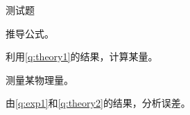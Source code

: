 \documentclass[answer]{cphos-e}
\begin{document}
\maketitlepage

\begin{problem}[30]{测试题}

\begin{expcontent}

\subq\label{q:theory1} 推导公式。

\subq\label{q:theory2} 利用\ref{q:theory1}的结果，计算某量。

\label{part:exp}

\subq\label{q:exp1} 测量某物理量。

\subq\label{q:exp2} 由\ref{q:exp1}和\ref{q:theory2}的结果，分析误差。
\end{expcontent}

\begin{expanswer}
\anspart[10]

\anspart[20]
\end{expanswer}

\end{problem}
\end{document}
